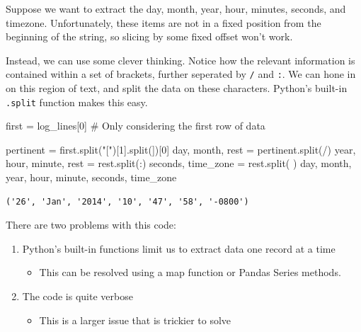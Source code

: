 \documentclass[
  letterpaper,
  DIV=11,
  numbers=noendperiod]{scrreprt}
\newenvironment{Shaded}{\begin{snugshade}}{\end{snugshade}}
\newcommand{\CommentTok}[1]{\textcolor[rgb]{0.37,0.37,0.37}{#1}}
\newcommand{\DecValTok}[1]{\textcolor[rgb]{0.68,0.00,0.00}{#1}}
\newcommand{\NormalTok}[1]{\textcolor[rgb]{0.00,0.23,0.31}{#1}}
\newcommand{\OperatorTok}[1]{\textcolor[rgb]{0.37,0.37,0.37}{#1}}
\newcommand{\StringTok}[1]{\textcolor[rgb]{0.13,0.47,0.30}{#1}}
\providecommand{\tightlist}{%
  \setlength{\itemsep}{0pt}\setlength{\parskip}{0pt}}\usepackage{longtable,booktabs,array}
\begin{document}
Suppose we want to extract the day, month, year, hour, minutes, seconds,
and timezone. Unfortunately, these items are not in a fixed position
from the beginning of the string, so slicing by some fixed offset won't
work.

Instead, we can use some clever thinking. Notice how the relevant
information is contained within a set of brackets, further seperated by
\texttt{/} and \texttt{:}. We can hone in on this region of text, and
split the data on these characters. Python's built-in \texttt{.split}
function makes this easy.

\begin{Shaded}
\begin{Highlighting}[]
\NormalTok{first }\OperatorTok{=}\NormalTok{ log\_lines[}\DecValTok{0}\NormalTok{] }\CommentTok{\# Only considering the first row of data}

\NormalTok{pertinent }\OperatorTok{=}\NormalTok{ first.split(}\StringTok{"["}\NormalTok{)[}\DecValTok{1}\NormalTok{].split(}\StringTok{\textquotesingle{}]\textquotesingle{}}\NormalTok{)[}\DecValTok{0}\NormalTok{]}
\NormalTok{day, month, rest }\OperatorTok{=}\NormalTok{ pertinent.split(}\StringTok{\textquotesingle{}/\textquotesingle{}}\NormalTok{)}
\NormalTok{year, hour, minute, rest }\OperatorTok{=}\NormalTok{ rest.split(}\StringTok{\textquotesingle{}:\textquotesingle{}}\NormalTok{)}
\NormalTok{seconds, time\_zone }\OperatorTok{=}\NormalTok{ rest.split(}\StringTok{\textquotesingle{} \textquotesingle{}}\NormalTok{)}
\NormalTok{day, month, year, hour, minute, seconds, time\_zone}
\end{Highlighting}
\end{Shaded}

\begin{verbatim}
('26', 'Jan', '2014', '10', '47', '58', '-0800')
\end{verbatim}

There are two problems with this code:

\begin{enumerate}
\def\labelenumi{\arabic{enumi}.}
\tightlist
\item
  Python's built-in functions limit us to extract data one record at a
  time

  \begin{itemize}
  \tightlist
  \item
    This can be resolved using a map function or Pandas Series methods.
  \end{itemize}
\item
  The code is quite verbose

  \begin{itemize}
  \tightlist
  \item
    This is a larger issue that is trickier to solve
  \end{itemize}
\end{enumerate}
\end{document}
